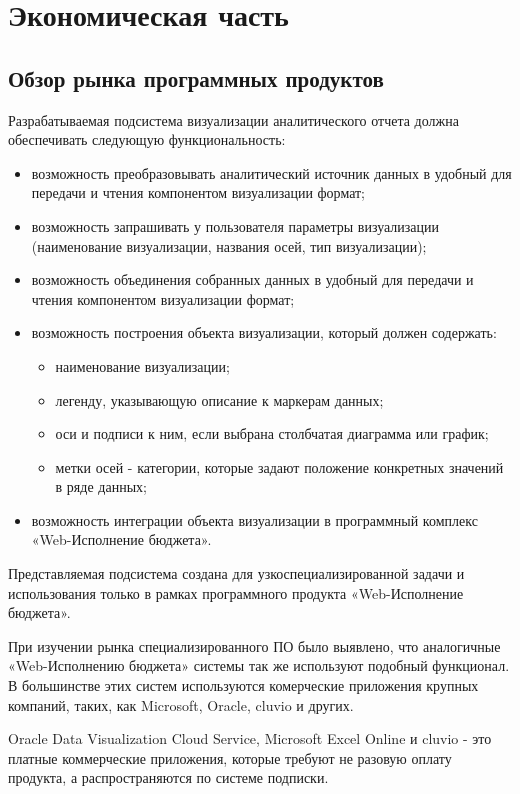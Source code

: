 \documentclass[a4paper]{extarticle}
\begin{document}
\section{Экономическая часть}

\subsection{Обзор рынка программных продуктов}
Разрабатываемая подсистема визуализации аналитического отчета должна обеспечивать следующую функциональность:\par
\begin{itemize}
  \item возможность преобразовывать аналитический источник данных в удобный для передачи и чтения компонентом визуализации формат;
  \item возможность запрашивать у пользователя параметры визуализации (наименование визуализации, названия осей, тип визуализации);
  \item возможность объединения собранных данных в удобный для передачи и чтения компонентом визуализации формат;
  \item возможность построения объекта визуализации, который должен содержать:
    \begin{itemize}
    	\item наименование визуализации;
        \item легенду, указывающую описание к маркерам данных;
    	\item оси и подписи к ним, если выбрана столбчатая диаграмма или график;
        \item метки осей - категории, которые задают положение конкретных значений в ряде данных;
    \end{itemize}
  \item возможность интеграции объекта визуализации в программный комплекс «Web-Исполнение бюджета».
\end{itemize}\par
Представляемая подсистема создана для узкоспециализированной задачи и использования только в рамках программного продукта «Web-Исполнение бюджета».\par
При изучении рынка специализированного ПО было выявлено, что аналогичные «Web-Исполнению бюджета» системы так же используют подобный функционал. В большинстве этих систем используются комерческие приложения крупных компаний, таких, как Microsoft, Oracle, cluvio и других.\par
Oracle Data Visualization Cloud Service, Microsoft Excel Online и cluvio - это платные коммерческие приложения, которые требуют не разовую оплату продукта, а распространяются по системе подписки.
\end{document}
